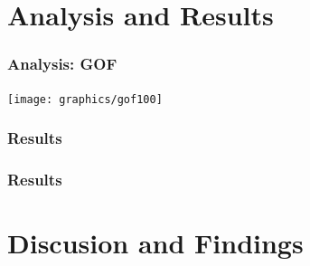 \documentclass{beamer}
\begin{document}
\section{Analysis and Results}

\begin{frame}
\frametitle{Analysis: GOF}

\begin{block}{}
\texttt{[image: graphics/gof100]}
\end{block}
\end{frame}


\begin{frame}
\frametitle{Results}



\end{frame}

\begin{frame}
\frametitle{Results}



\end{frame}

\section{Discusion and Findings}
\end{document}
